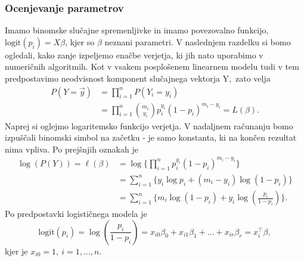 \documentclass[12pt,a4paper]{amsart}
\theoremstyle{definition} %
\theoremstyle{plain} %
\begin{document}
\subsubsection{Ocenjevanje parametrov}\label{ocenpar_logit}
Imamo binomske slučajne spremenljivke in imamo povezovalno funkcijo, $\mathrm{logit}(p_{i}) = X\beta$, kjer so $\beta$ neznani parametri.
V naslednjem razdelku si bomo ogledali, kako zanje izpeljemo enačbe verjetja, ki jih nato uporabimo v numeričnih algoritmih.
Kot v vsakem posplošenem linearnem modelu tudi v tem predpostavimo neodvisnost komponent slučajnega vektorja $\mathrm{Y},$ zato velja
\begin{align*}
    P(Y = \vec{y}) &= \prod_{i=1}^{n} P(Y_{i} = y_{i}) \\
                    &=\prod_{i=1}^{n} {m_{i} \choose y_{i}} p_{i}^{y_{i}}(1 - p_{i})^{m_{i} - y_{i}} = L(\beta).
\end{align*}
Naprej si oglejmo logaritemsko funkcijo verjetja. V nadaljnem računanju bomo izpuščali binomski simbol na začetku - je samo konstanta, ki na
končen rezultat nima vpliva. Po prejšnjih oznakah je
\begin{align}
    \log (P(Y)) = \ell(\beta) &= \log\{\prod_{i=1}^{n} p_{i}^{y_{i}}(1 - p_{i})^{m_{i} - y_{i}} \} \nonumber  \\
        &= \sum_{i=1}^{n}\{y_{i}\log{p_{i}} + (m_{i} - y_{i})\log(1 - p_{i})\} \nonumber \\
        &= \sum_{i=1}^{n}\{m_{i}\log{(1-p_{i})}  + y_{i}\log{\left(\frac{p_{i}}{1-p_{i}}\right)}\}.
\end{align}
Po predpostavki logističnega modela je
\[
   \mathrm{logit}(p_{i}) = \log\left( \frac{p_{i}}{1-p_{i}}  \right) = x_{i0}\beta_{0} + x_{i1}\beta_{1} + \ldots + x_{ir}\beta_{r} = x_{i}^\top \beta,
\]
kjer je $x_{i0}=1,~i=1,\ldots,n.$
\end{document}

